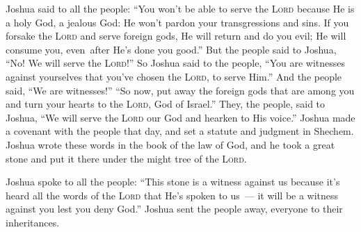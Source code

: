 \begin{inparaenum}
     Joshua said to all the people: ``You won't be able to serve the \textsc{Lord} because He is a holy God, a jealous God: He won't pardon your transgressions and sins.%
     If you forsake the \textsc{Lord} and serve foreign gods, He will return and do you evil; He will consume you, even\understood\ after He's done you good.''%
     But the people said to Joshua, ``No! We will serve the \textsc{Lord}!''%
     So Joshua said to the people, ``You are witnesses against yourselves that you've chosen the \textsc{Lord}, to serve Him.'' And the people said, ``We are witnesses!''%
     ``So now, put away the foreign gods that are among you and turn your hearts to the \textsc{Lord}, God of Israel.''%
     They, the people, said to Joshua, ``We will serve the \textsc{Lord} our God and hearken to His voice.''%
     Joshua made a covenant with the people that day, and set a statute and judgment in Shechem.%
     Joshua wrote these words in the book of the law of God, and he took a great stone and put it there under the might tree of the \textsc{Lord}.%
    
     Joshua spoke to all the people: ``This stone is a witness against us because it's heard all the words of the \textsc{Lord} that He's spoken to us~--- it will be a witness against you lest you deny God.''%
     Joshua sent the people away, everyone to their inheritances.%
    

\end{inparaenum}
